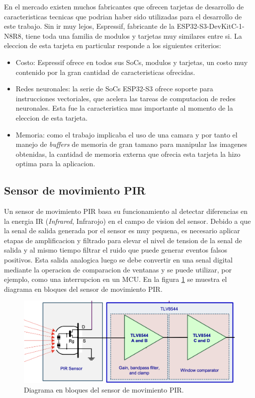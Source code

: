 En el mercado existen muchos fabricantes que ofrecen tarjetas de desarrollo de caracteristicas tecnicas que podrian haber sido utilizadas para el desarrollo de este trabajo. Sin ir muy lejos, Espressif, fabricante de la ESP32-S3-DevKitC-1-N8R8, tiene toda una familia de modulos y tarjetas muy similares entre si. La eleccion de esta tarjeta en particular responde a los siguientes criterios:
\begin{itemize}
	\item Costo: Espressif ofrece en todos sus SoCs, modulos y tarjetas, un costo muy contenido por la gran cantidad de caracteristicas ofrecidas.
	\item Redes neuronales: la serie de SoCs ESP32-S3 ofrece soporte para instrucciones vectoriales, que acelera las tareas de computacion de redes neuronales. Esta fue la caracteristica mas importante al momento de la eleccion de esta tarjeta.
	\item Memoria: como el trabajo implicaba el uso de una camara y por tanto el manejo de \textit{buffers} de memoria de gran tamano para manipular las imagenes obtenidas, la cantidad de memoria externa que ofrecia esta tarjeta la hizo optima para la aplicacion. 
\end{itemize}

\subsection{Sensor de movimiento PIR}
Un sensor de movimiento PIR basa su funcionamiento al detectar diferencias en la energia IR (\textit{Infrared}, Infrarojo) en el campo de vision del sensor. Debido a que la senal de salida generada por el sensor es muy pequena, es necesario aplicar etapas de amplificacion y filtrado para elevar el nivel de tension de la senal de salida y al mismo tiempo filtrar el ruido que puede generar eventos falsos positivos. Esta salida analogica luego se debe convertir en una senal digital mediante la operacion de comparacion de ventanas y se puede utilizar, por ejemplo, como una interrupcion en un MCU. En la figura \ref{fig:move_blocks} se muestra el diagrama en bloques del sensor de movimiento PIR.

\begin{figure}[h]
	\centering
	\includegraphics[scale=0.4]{./Figures/move_blocks.png}
	\caption{Diagrama en bloques del sensor de movimiento PIR.}
	\label{fig:move_blocks}
\end{figure}

